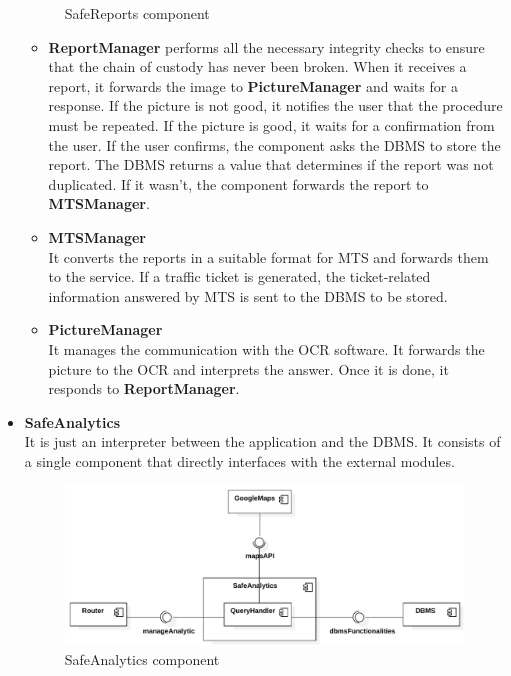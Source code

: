 \documentclass[./main.tex]{subfiles}
\begin{document}
\begin{itemize}
\begin{figure}[H]
  \caption{SafeReports component}
  \end{figure}
  \begin{itemize}
  \item
    \textbf{ReportManager} performs all the necessary integrity checks to
    ensure that the chain of custody has never been broken. When it receives a
    report, it forwards the image to \textbf{PictureManager} and waits for a
    response. If the picture is not good, it notifies the user that the
    procedure must be repeated. If the picture is good, it waits for a
    confirmation from the user. If the user confirms, the component asks the
    DBMS to store the report. The DBMS returns a value that determines if the
    report was not duplicated. If it wasn't, the component forwards the report
    to \textbf{MTSManager}.
  \item
    \textbf{MTSManager}\\
    It converts the reports in a suitable format for MTS and forwards them to
    the service. If a traffic ticket is generated, the ticket-related
    information answered by MTS is sent to the DBMS to be stored.
  \item
    \textbf{PictureManager}\\
    It manages the communication with the OCR software. It forwards the picture
    to the OCR and interprets the answer. Once it is done, it responds to
    \textbf{ReportManager}.
  \end{itemize}
\item
  \textbf{SafeAnalytics}\\
  It is just an interpreter between the application and the DBMS. It consists
  of a single component that directly interfaces with the external modules.
  \begin{figure}[H]
  \centering
  \includegraphics[width=\textwidth]{resources/component_diagram/component_diagram_safe_analytics}
  \caption{SafeAnalytics component}
  \end{figure}
  \begin{itemize}

\end{itemize}
\end{itemize}
\end{document}

